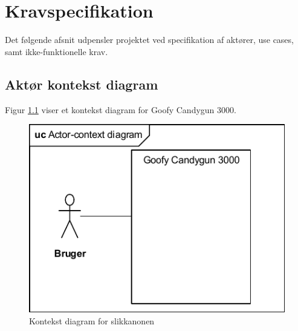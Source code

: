 
\renewcommand{\labelenumii}{\theenumii}
\renewcommand{\theenumii}{\theenumi.\arabic{enumii}.}
\chapter{Kravspecifikation}
\label{afsnit:kravspecifikation}
Det følgende afsnit udpensler projektet ved specifikation af aktører, use cases, samt ikke-funktionelle krav.

\section{Aktør kontekst diagram}
Figur \ref{ref:kontekstDiagram} viser et kontekst diagram for Goofy Candygun 3000.
\begin{figure}[H]
	\centering
	\includegraphics[]{Kravspecifikation/images/kontekstDiagram}
	\caption{Kontekst diagram for slikkanonen}
	\label{ref:kontekstDiagram}
\end{figure}


